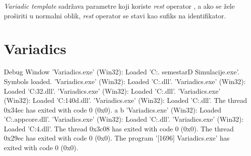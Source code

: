 \begin{codelisting}
	
\end{codelisting}

\pagebreak

\emph{Variadic template} sadržava parametre koji koriste \emph{rest} operator , a ako se žele proširiti u normalni oblik, \emph{rest} operator se stavi kao sufiks na identifikator.

\begin{codelisting}
	
\end{codelisting}

\begin{codesection}
	
\end{codesection}

\pagebreak

\section{Variadics}
\label{sec:vars}
\setcounter{lstlisting}{0}

\begin{codelisting}
	
\end{codelisting}

\begin{codelisting}
	
\end{codelisting}

\begin{codesection}
	\begin{stdout}{Debug Window}{}
'Variadics.exe' (Win32): Loaded 'C:\Users\Jakov\FESB\2. semestar\3D Simulacije\Debug\Variadics.exe'. Symbols loaded.
'Variadics.exe' (Win32): Loaded 'C:\Windows{}\ntdll.dll'. 
'Variadics.exe' (Win32): Loaded 'C:\Windows{}32.dll'. 
'Variadics.exe' (Win32): Loaded 'C:\Windows{}\KernelBase.dll'. 
'Variadics.exe' (Win32): Loaded 'C:\Windows{}\vcruntime140d.dll'. 
'Variadics.exe' (Win32): Loaded 'C:\Windows{}\ucrtbased.dll'. 
The thread 0x34ec has exited with code 0 (0x0).
a b 
'Variadics.exe' (Win32): Loaded 'C:\Windows{}.appcore.dll'. 
'Variadics.exe' (Win32): Loaded 'C:\Windows{}\msvcrt.dll'. 
'Variadics.exe' (Win32): Loaded 'C:\Windows{}\rpcrt4.dll'. 
The thread 0x3c08 has exited with code 0 (0x0).
The thread 0x29ec has exited with code 0 (0x0).
The program '[1696] Variadics.exe' has exited with code 0 (0x0).
	\end{stdout}
\end{codesection}



